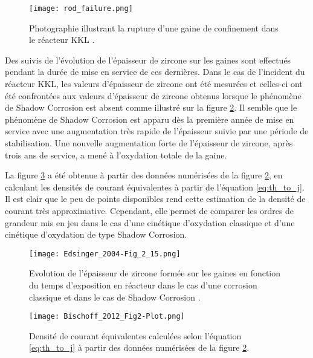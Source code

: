 \begin{refsection}
         
     \begin{figure}[H] 
        \centering 
        \texttt{[image: rod\_failure.png]}
        \caption[Photographie illustrant la rupture d'une gaine de confinement dans le réacteur KKL]
        {Photographie illustrant la rupture d'une gaine de confinement dans le réacteur KKL \citep{Edsinger2004}.} 
        \label{fig:fuel_rod_failure_KKL} 
     \end{figure}


Des suivis de l'évolution de l'épaisseur de zircone sur les gaines sont effectués pendant la durée de mise en service de
ces dernières. Dans le cas de l'incident du réacteur KKL, les valeurs d'épaisseur de zircone ont été mesurées et celles-ci
ont été confrontées aux valeurs d'épaisseur de zircone obtenus lorsque le phénomène de Shadow Corrosion est absent comme
illustré sur la figure \ref{fig:KKL_shadow_values}. Il semble que le phénomène de Shadow Corrosion est apparu dès la
première année de mise en service avec une augmentation très rapide de l'épaisseur suivie par une période de
stabilisation. Une nouvelle augmentation forte de l'épaisseur de zircone, après trois ans de service, a mené à l'oxydation
totale de la gaine.

La figure \ref{fig:KKL_shadow_digitalization} a été obtenue à partir des données numérisées de la 
figure \ref{fig:KKL_shadow_values}, en calculant les densités de courant équivalentes à partir de l'équation
\ref{eq:th_to_j}. Il est clair que le peu de points disponibles rend cette estimation de la densité de courant très 
approximative. Cependant, elle permet de comparer les ordres de grandeur mis en jeu dans le cas
d'une cinétique d'oxydation classique et d'une cinétique d'oxydation de type Shadow Corrosion. 

    \begin{figure}[H] 
        \centering 
        \texttt{[image: Edsinger\_2004-Fig\_2\_15.png]}
        \caption[Evolution de l'épaisseur de la couche de zircone formée sur les gaines en fonction du temps d'exposition en réacteur
        dans le cas d'une corrosion classique et dans le cas de Shadow Corrosion.]
        {Evolution de l'épaisseur de zircone formée sur les gaines en fonction du temps d'exposition en réacteur
        dans le cas d'une corrosion classique et dans le cas de Shadow Corrosion \citep{Edsinger2004}.} 
        \label{fig:KKL_shadow_values} 
     \end{figure}  

     \begin{figure}[H]
         \centering
            \texttt{[image: Bischoff\_2012\_Fig2-Plot.png]}
            \caption{Densité de courant équivalentes calculées selon l'équation \ref{eq:th_to_j} à partir des données
            numérisées de la figure \ref{fig:KKL_shadow_values}.} 
            \label{fig:KKL_shadow_digitalization} 
    \end{figure} 
    

\end{refsection}
